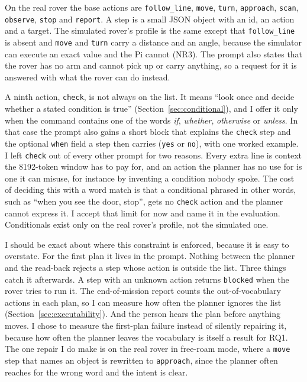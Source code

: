 On the real rover the base actions are \texttt{follow\_line}, \texttt{move},
\texttt{turn}, \texttt{approach}, \texttt{scan}, \texttt{observe}, \texttt{stop}
and \texttt{report}. A step is a small JSON object with an id, an action and a
target. The simulated rover's profile is the same except that
\texttt{follow\_line} is absent and \texttt{move} and \texttt{turn} carry a
distance and an angle, because the simulator can execute an exact value and the
Pi cannot (NR3). The prompt also states that the rover has no arm and cannot pick
up or carry anything, so a request for it is answered with what the rover can do
instead.

A ninth action, \texttt{check}, is not always on the list. It means ``look once
and decide whether a stated condition is true'' (Section~\ref{sec:conditional}),
and I offer it only when the command contains one of the words \emph{if},
\emph{whether}, \emph{otherwise} or \emph{unless}. In that case the prompt also
gains a short block that explains the \texttt{check} step and the optional
\texttt{when} field a step then carries (\texttt{yes} or \texttt{no}), with one
worked example. I left \texttt{check} out of every other prompt for two reasons.
Every extra line is context the 8192-token window has to pay for, and an action
the planner has no use for is one it can misuse, for instance by inventing a
condition nobody spoke. The cost of deciding this with a word match is that a
conditional phrased in other words, such as ``when you see the door, stop'', gets
no \texttt{check} action and the planner cannot express it. I accept that limit
for now and name it in the evaluation. Conditionals exist only on the real rover's
profile, not the simulated one.

I should be exact about where this constraint is enforced, because it is easy to
overstate. For the first plan it lives in the prompt. Nothing between the planner
and the read-back rejects a step whose action is outside the list. Three things
catch it afterwards. A step with an unknown action returns \texttt{blocked} when
the rover tries to run it. The end-of-mission report counts the out-of-vocabulary
actions in each plan, so I can measure how often the planner ignores the list
(Section~\ref{sec:executability}). And the person hears the plan before anything
moves. I chose to measure the first-plan failure instead of silently repairing it,
because how often the planner leaves the vocabulary is itself a result for RQ1.
The one repair I do make is on the real rover in free-roam mode, where a
\texttt{move} step that names an object is rewritten to \texttt{approach}, since
the planner often reaches for the wrong word and the intent is clear.

